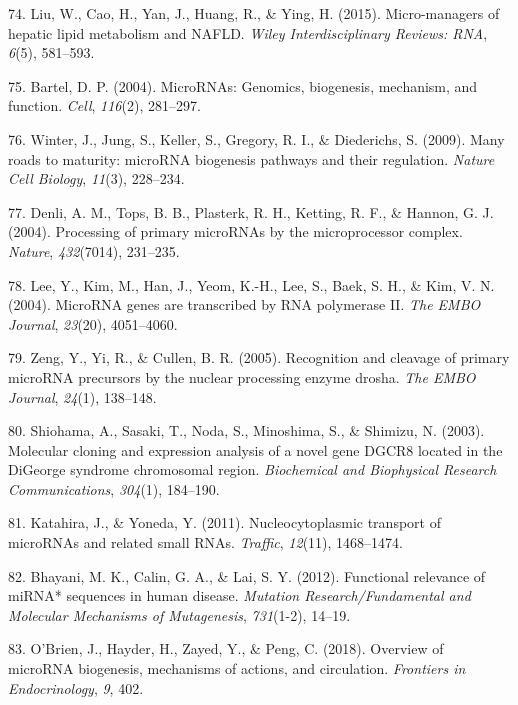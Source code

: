 \documentclass[
  11pt,
  letterpaper,
]{book}
\newlength{\cslhangindent}
\newenvironment{CSLReferences}[2] %
 {\begin{list}{}{%
  \setlength{\itemindent}{0pt}
  \setlength{\leftmargin}{0pt}
  \setlength{\parsep}{0pt}
  \ifodd #1
   \setlength{\leftmargin}{\cslhangindent}
   \setlength{\itemindent}{-1\cslhangindent}
  \fi
  \setlength{\itemsep}{#2\baselineskip}}}
 {\end{list}}
\begin{document}
\begin{CSLReferences}{1}{0}
74. Liu, W., Cao, H., Yan, J., Huang, R., \& Ying, H. (2015).
Micro-managers of hepatic lipid metabolism and NAFLD. \emph{Wiley
Interdisciplinary Reviews: RNA}, \emph{6}(5), 581--593.

75. Bartel, D. P. (2004). MicroRNAs: Genomics, biogenesis, mechanism,
and function. \emph{Cell}, \emph{116}(2), 281--297.

76. Winter, J., Jung, S., Keller, S., Gregory, R. I., \& Diederichs, S.
(2009). Many roads to maturity: microRNA biogenesis pathways and their
regulation. \emph{Nature Cell Biology}, \emph{11}(3), 228--234.

77. Denli, A. M., Tops, B. B., Plasterk, R. H., Ketting, R. F., \&
Hannon, G. J. (2004). Processing of primary microRNAs by the
microprocessor complex. \emph{Nature}, \emph{432}(7014), 231--235.

78. Lee, Y., Kim, M., Han, J., Yeom, K.-H., Lee, S., Baek, S. H., \&
Kim, V. N. (2004). MicroRNA genes are transcribed by RNA polymerase II.
\emph{The EMBO Journal}, \emph{23}(20), 4051--4060.

79. Zeng, Y., Yi, R., \& Cullen, B. R. (2005). Recognition and cleavage
of primary microRNA precursors by the nuclear processing enzyme drosha.
\emph{The EMBO Journal}, \emph{24}(1), 138--148.

80. Shiohama, A., Sasaki, T., Noda, S., Minoshima, S., \& Shimizu, N.
(2003). Molecular cloning and expression analysis of a novel gene DGCR8
located in the DiGeorge syndrome chromosomal region. \emph{Biochemical
and Biophysical Research Communications}, \emph{304}(1), 184--190.

81. Katahira, J., \& Yoneda, Y. (2011). Nucleocytoplasmic transport of
microRNAs and related small RNAs. \emph{Traffic}, \emph{12}(11),
1468--1474.

82. Bhayani, M. K., Calin, G. A., \& Lai, S. Y. (2012). Functional
relevance of miRNA* sequences in human disease. \emph{Mutation
Research/Fundamental and Molecular Mechanisms of Mutagenesis},
\emph{731}(1-2), 14--19.

83. O'Brien, J., Hayder, H., Zayed, Y., \& Peng, C. (2018). Overview of
microRNA biogenesis, mechanisms of actions, and circulation.
\emph{Frontiers in Endocrinology}, \emph{9}, 402.


\end{CSLReferences}
\end{document}
